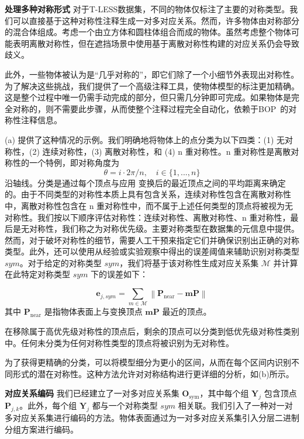 \textbf{处理多种对称形式 } 对于T-LESS数据集，不同的物体仅标注了主要的对称类型。我们可以直接基于这种对称性注释生成一对多对应关系。然而，许多物体由对称部分的混合体组成。考虑一个由立方体和圆柱体组合而成的物体。虽然考虑整个物体可能表明离散对称性，但在遮挡场景中使用基于离散对称性构建的对应关系仍会导致歧义。

此外，一些物体被认为是“几乎对称的”，即它们除了一个小细节外表现出对称性。为了解决这些挑战，我们提供了一个高级注释工具，使物体模型的标注更加精确。这是整个过程中唯一仍需手动完成的部分，但只需几分钟即可完成。如果物体是完全对称的，则不需要此步骤，从而使整个注释过程完全自动化，依赖于BOP~\cite{hodan2024bop}的对称性注释信息。

(a) 提供了这种情况的示例。我们明确地将物体上的点分类为以下四类：(1) 无对称性，(2) 连续对称性，(3) 离散对称性，和 (4) n 重对称性。n 重对称性是离散对称性的一个特例，即对称角度为
\begin{equation}
\theta=i \cdot 2\pi /n,\quad i \in \{1,...,n\}
\end{equation}
沿轴线。分类是通过每个顶点与应用  变换后的最近顶点之间的平均距离来确定的。由于不同类型的对称性本质上具有包含关系，连续对称性包含在离散对称性中，离散对称性包含在 n 重对称性中，而不属于上述任何类型的顶点将被视为无对称性。我们按以下顺序评估对称性：连续对称性、离散对称性、n 重对称性，最后是无对称性，我们称之为对称优先级。主要对称类型在数据集的元信息中提供。然而，对于破坏对称性的细节，需要人工干预来指定它们并确保识别出正确的对称类型。此外，还可以使用从经验或实验观察中得出的误差阈值来辅助识别对称类型 $sym$。对于给定的对称类型 $sym$，我们将基于该对称性生成对应关系集 $\mathcal{M}$ 并计算在此特定对称类型 $sym$ 下的误差如下：

\begin{equation}
\mathbf{e}_{j,sym} = \sum_{m\in\mathcal{M}}\left \|  \mathbf{P}_{\text{near}} - \mathbf{m}\mathbf{P} \right \| 
\end{equation}
其中 $\mathbf{P}_{\text{near}}$ 是指物体表面上与变换顶点 $\mathbf{m}\mathbf{P}$ 最近的顶点。

在移除属于高优先级对称性的顶点后，剩余的顶点可以分类到低优先级对称性类别中。任何未分类为任何对称性类型的顶点将被识别为无对称性。

为了获得更精确的分类，可以将模型细分为更小的区间，从而在每个区间内识别不同形式的潜在对称性。这种方法允许对对称结构进行更详细的分析，如(b)所示。

\textbf{对应关系编码 } 我们已经建立了一对多对应关系集 $\mathbf{O}_\text{sym}$，其中每个组 $\mathbf{Y}_j$ 包含顶点 $\mathbf{P}_{j,k}$。此外，每个组 $\mathbf{Y}_j$ 都与一个对称类型 $sym$ 相关联。我们引入了一种对一对多对应关系集进行编码的方法。物体表面通过为一对多对应关系集引入分层二进制分组方案进行编码。

